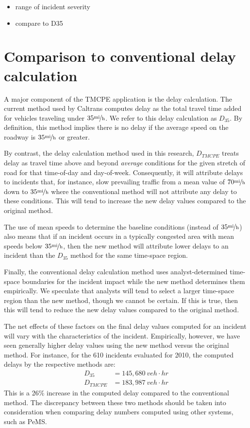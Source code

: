 \documentclass[12pt]{report}
\renewcommand{\fixme}[3][]{#1\xspace}
\newcounter{time}
\newcounter{space}
\begin{document}
\begin{itemize}
\item range of incident severity
\item compare to D35
\end{itemize}

\section{Comparison to conventional delay calculation}
\label{sec:compare-conv}

A major component of the \ac{TMCPE} application is the delay calculation.  The
current method used by Caltrans computes delay as the total travel time added
for vehicles traveling under \fixme[$35\unitfrac{mi}{h}$]{crindt}{refer to the
  original equation}.  We refer to this delay calculation as $D_{35}$.  By
definition, this method implies there is no delay if the average speed on the
roadway is $35\unitfrac{mi}{h}$ or greater.

By contrast, the delay calculation method used in this research,
$D_{TMCPE}$ treats delay as travel time above and beyond
\emph{average} conditions for the given stretch of road for that
time-of-day and day-of-week.  Consequently, it will attribute delays
to incidents that, for instance, slow prevailing traffic from a mean
value of $70\unitfrac{mi}{h}$ down to $35\unitfrac{mi}{h}$ where the
conventional method will not attribute any delay to these conditions.
This will tend to increase the new delay values compared to the
original method.

The use of mean speeds to determine the baseline conditions (instead of
$35\unitfrac{mi}{h}$) also means that if an incident occurs in a typically
congested area with mean speeds below $35\unitfrac{mi}{h}$, then the new method
will attribute lower delays to an incident than the $D_{35}$ method for the same
time-space region.

Finally, the conventional delay calculation method uses analyst-determined
time-space boundaries for the incident impact while the new method determines
them empirically.  We speculate that analysts will tend to select a larger
time-space region than the new method, though we cannot be certain.  If this is
true, then this will tend to reduce the new delay values compared to the
original method.

The net effects of these factors on the final delay values computed for an
incident will vary with the characteristics of the incident.  Empirically,
however, we have seen generally higher delay values using the new method versus
the original method.  For instance, for the 610 incidents evaluated for 2010,
the computed delays by the respective methods are:
\begin{eqnarray*}
    D_{35}   & = 145,680\:\unit{veh\cdot{}hr} \\
    D_{TMCPE} & = 183,987\:\unit{veh\cdot{}hr}
\end{eqnarray*}
This is a 26\% increase in the computed delay compared to the conventional
method.  The discrepancy between these two methods should be taken into
consideration when comparing delay numbers computed using other systems, such as
\ac{PeMS}.
\end{document}
